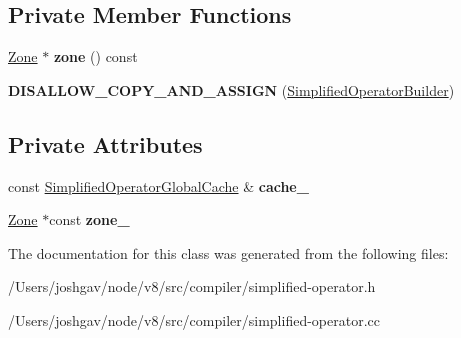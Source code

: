 \subsection*{Private Member Functions}
\begin{DoxyCompactItemize}
\item 
\hyperlink{classv8_1_1internal_1_1_zone}{Zone} $\ast$ {\bfseries zone} () const \hypertarget{classv8_1_1internal_1_1compiler_1_1_simplified_operator_builder_abf99803692b3b062be110c8151fea9a6}{}\label{classv8_1_1internal_1_1compiler_1_1_simplified_operator_builder_abf99803692b3b062be110c8151fea9a6}

\item 
{\bfseries D\+I\+S\+A\+L\+L\+O\+W\+\_\+\+C\+O\+P\+Y\+\_\+\+A\+N\+D\+\_\+\+A\+S\+S\+I\+GN} (\hyperlink{classv8_1_1internal_1_1compiler_1_1_simplified_operator_builder}{Simplified\+Operator\+Builder})\hypertarget{classv8_1_1internal_1_1compiler_1_1_simplified_operator_builder_a9d3cf16646e90f0db0104dffbf98a965}{}\label{classv8_1_1internal_1_1compiler_1_1_simplified_operator_builder_a9d3cf16646e90f0db0104dffbf98a965}

\end{DoxyCompactItemize}
\subsection*{Private Attributes}
\begin{DoxyCompactItemize}
\item 
const \hyperlink{structv8_1_1internal_1_1compiler_1_1_simplified_operator_global_cache}{Simplified\+Operator\+Global\+Cache} \& {\bfseries cache\+\_\+}\hypertarget{classv8_1_1internal_1_1compiler_1_1_simplified_operator_builder_ae1aa15b496e31733482e495c11c9d664}{}\label{classv8_1_1internal_1_1compiler_1_1_simplified_operator_builder_ae1aa15b496e31733482e495c11c9d664}

\item 
\hyperlink{classv8_1_1internal_1_1_zone}{Zone} $\ast$const {\bfseries zone\+\_\+}\hypertarget{classv8_1_1internal_1_1compiler_1_1_simplified_operator_builder_a512d71394600542051f5bc036bb29935}{}\label{classv8_1_1internal_1_1compiler_1_1_simplified_operator_builder_a512d71394600542051f5bc036bb29935}

\end{DoxyCompactItemize}


The documentation for this class was generated from the following files\+:\begin{DoxyCompactItemize}
\item 
/\+Users/joshgav/node/v8/src/compiler/simplified-\/operator.\+h\item 
/\+Users/joshgav/node/v8/src/compiler/simplified-\/operator.\+cc\end{DoxyCompactItemize}
